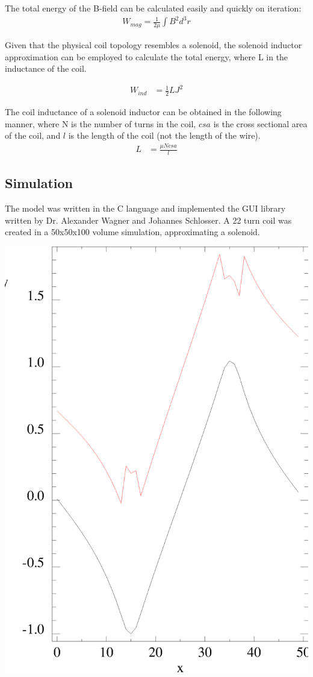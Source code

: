 \documentclass[12pt,a4paper]{article}
\begin{document}
The total energy of the B-field can be calculated easily and quickly on iteration:
\begin{align}
W_{mag} = \frac{1}{2\mu}\int B^2 d^3r  
\end{align}

Given that the physical coil topology resembles a solenoid, the solenoid inductor approximation can be employed to calculate the total energy, where L in the inductance of the coil.

\begin{align}
W_{ind} &= \frac{1}{2}LJ^2 
\end{align}
 
The coil inductance of a solenoid inductor can be obtained in the following manner, where N is the number of turns in the coil, $\textit{csa}$ is the cross sectional area of the coil, and $\textit{l}$ is the length of the coil (not the length of the wire).
\begin{align}
L &= \frac{\mu N \textit{csa}}{\textit{l}} 
\end{align}

\subsection{Simulation}
The model was written in the C language and implemented the GUI library written by Dr. Alexander Wagner and Johannes Schlosser. A 22 turn coil was created in a 50x50x100 volume simulation, approximating a solenoid.

\includegraphics[scale=.7]{Simulations/Analytical-Sim.eps} 
\end{document}
